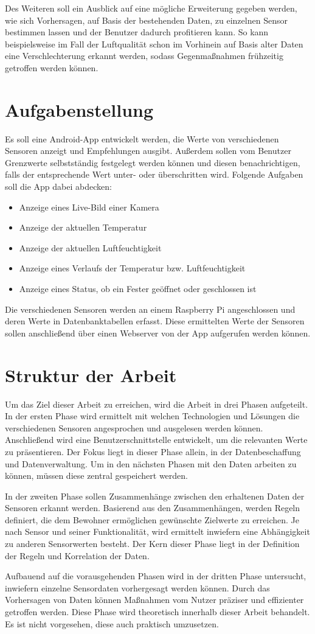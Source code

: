 Des Weiteren soll ein Ausblick auf eine mögliche Erweiterung gegeben werden, wie sich Vorhersagen, auf Basis der bestehenden Daten, zu einzelnen Sensor bestimmen lassen und der Benutzer dadurch profitieren kann. So kann beispielsweise im Fall der Luftqualität schon im Vorhinein auf Basis alter Daten eine Verschlechterung erkannt werden, sodass Gegenmaßnahmen frühzeitig getroffen werden können.
\section{Aufgabenstellung}
Es soll eine Android-App entwickelt werden, die Werte von verschiedenen Sensoren anzeigt und Empfehlungen ausgibt. Außerdem sollen vom Benutzer Grenzwerte selbstständig festgelegt werden können und diesen benachrichtigen, falls der entsprechende Wert unter- oder überschritten wird. 
Folgende Aufgaben soll die App dabei abdecken:
\begin{itemize}
	\item Anzeige eines Live-Bild einer Kamera
	\item Anzeige der aktuellen Temperatur
	\item Anzeige der aktuellen Luftfeuchtigkeit
	\item Anzeige eines Verlaufs der Temperatur bzw. Luftfeuchtigkeit
	\item Anzeige eines Status, ob ein Fester geöffnet oder geschlossen ist
\end{itemize} 
Die verschiedenen Sensoren werden an einem Raspberry Pi angeschlossen und deren Werte in Datenbanktabellen erfasst. Diese ermittelten Werte der Sensoren sollen anschließend über einen Webserver von der App aufgerufen werden können.


\section{Struktur der Arbeit}
Um das Ziel dieser Arbeit zu erreichen, wird die Arbeit in drei Phasen aufgeteilt. In der ersten Phase wird ermittelt mit welchen Technologien und Lösungen die verschiedenen Sensoren angesprochen und ausgelesen werden können. Anschließend wird eine Benutzerschnittstelle entwickelt, um die relevanten Werte zu präsentieren. Der Fokus liegt in dieser Phase allein, in der Datenbeschaffung und Datenverwaltung. Um in den nächsten Phasen mit den Daten arbeiten zu können, müssen diese zentral gespeichert werden.

In der zweiten Phase sollen Zusammenhänge zwischen den erhaltenen Daten der Sensoren erkannt werden. Basierend aus den Zusammenhängen, werden Regeln definiert, die dem Bewohner ermöglichen gewünschte Zielwerte zu erreichen. Je nach Sensor und seiner Funktionalität, wird ermittelt inwiefern eine Abhängigkeit zu anderen Sensorwerten besteht. Der Kern dieser Phase liegt in der Definition der Regeln und Korrelation der Daten.

Aufbauend auf die vorausgehenden Phasen wird in der dritten Phase untersucht, inwiefern einzelne Sensordaten vorhergesagt werden können. Durch das Vorhersagen von Daten können Maßnahmen vom Nutzer präziser und effizienter getroffen werden. Diese Phase wird theoretisch innerhalb dieser Arbeit behandelt. Es ist nicht vorgesehen, diese auch praktisch umzusetzen.